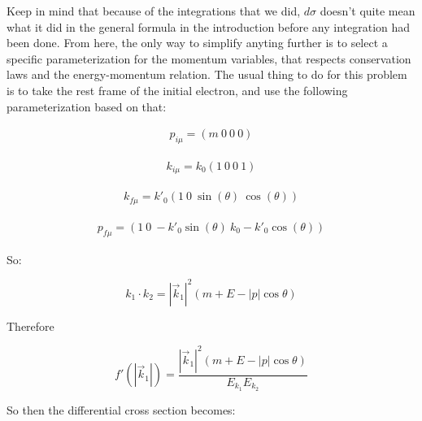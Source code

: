 \documentclass[a4]{article}
\begin{document}
    Keep in mind that because of the integrations that we did, $d \sigma$ doesn't quite mean what it did in the general formula in the introduction before any integration had been done. From here, the only way to simplify anyting further 
    is to select a specific parameterization for the momentum variables, that respects conservation laws and the energy-momentum relation. The usual thing to do for this problem is to take the rest frame of the initial electron, and use
    the following parameterization based on that:

    \begin{equation}
        \begin{aligned}
            p_{i \mu}  = (m \: 0 \: 0 \: 0)
        \end{aligned}
    \end{equation}

    \begin{equation}
        \begin{aligned}
            k_{i \mu}  = k_0 (1 \: 0 \: 0 \: 1)
        \end{aligned}
    \end{equation}

    \begin{equation}
        \begin{aligned}
            k_{f \mu}  = k'_0 (1 \: 0 \: \sin (\theta) \: \cos (\theta) )
        \end{aligned}
    \end{equation}

    \begin{equation}
        \begin{aligned}
            p_{f \mu}  = (1 \: 0 \: -k'_0 \sin (\theta) \: k_0 - k'_0 \cos (\theta) )
        \end{aligned}
    \end{equation}

    So:

    \begin{equation}
        k_1 \cdot k_2 = |\vec{k}_1|^2 (m + E - |p| \cos \theta)
    \end{equation}

    Therefore

    \begin{equation}
        f' (|\vec{k}_1|) = \frac{|\vec{k}_1|^2 (m + E - |p| \cos \theta)}{E_{k_1} E_{k_2}}
    \end{equation}

    So then the differential cross section becomes:
\end{document}
